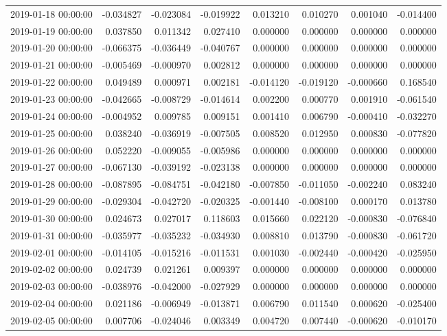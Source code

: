 \begin{tabular}{lrrrrrrr}
2019-01-18 00:00:00 & -0.034827 & -0.023084 & -0.019922 & 0.013210 & 0.010270 & 0.001040 & -0.014400 \\
2019-01-19 00:00:00 & 0.037850 & 0.011342 & 0.027410 & 0.000000 & 0.000000 & 0.000000 & 0.000000 \\
2019-01-20 00:00:00 & -0.066375 & -0.036449 & -0.040767 & 0.000000 & 0.000000 & 0.000000 & 0.000000 \\
2019-01-21 00:00:00 & -0.005469 & -0.000970 & 0.002812 & 0.000000 & 0.000000 & 0.000000 & 0.000000 \\
2019-01-22 00:00:00 & 0.049489 & 0.000971 & 0.002181 & -0.014120 & -0.019120 & -0.000660 & 0.168540 \\
2019-01-23 00:00:00 & -0.042665 & -0.008729 & -0.014614 & 0.002200 & 0.000770 & 0.001910 & -0.061540 \\
2019-01-24 00:00:00 & -0.004952 & 0.009785 & 0.009151 & 0.001410 & 0.006790 & -0.000410 & -0.032270 \\
2019-01-25 00:00:00 & 0.038240 & -0.036919 & -0.007505 & 0.008520 & 0.012950 & 0.000830 & -0.077820 \\
2019-01-26 00:00:00 & 0.052220 & -0.009055 & -0.005986 & 0.000000 & 0.000000 & 0.000000 & 0.000000 \\
2019-01-27 00:00:00 & -0.067130 & -0.039192 & -0.023138 & 0.000000 & 0.000000 & 0.000000 & 0.000000 \\
2019-01-28 00:00:00 & -0.087895 & -0.084751 & -0.042180 & -0.007850 & -0.011050 & -0.002240 & 0.083240 \\
2019-01-29 00:00:00 & -0.029304 & -0.042720 & -0.020325 & -0.001440 & -0.008100 & 0.000170 & 0.013780 \\
2019-01-30 00:00:00 & 0.024673 & 0.027017 & 0.118603 & 0.015660 & 0.022120 & -0.000830 & -0.076840 \\
2019-01-31 00:00:00 & -0.035977 & -0.035232 & -0.034930 & 0.008810 & 0.013790 & -0.000830 & -0.061720 \\
2019-02-01 00:00:00 & -0.014105 & -0.015216 & -0.011531 & 0.001030 & -0.002440 & -0.000420 & -0.025950 \\
2019-02-02 00:00:00 & 0.024739 & 0.021261 & 0.009397 & 0.000000 & 0.000000 & 0.000000 & 0.000000 \\
2019-02-03 00:00:00 & -0.038976 & -0.042000 & -0.027929 & 0.000000 & 0.000000 & 0.000000 & 0.000000 \\
2019-02-04 00:00:00 & 0.021186 & -0.006949 & -0.013871 & 0.006790 & 0.011540 & 0.000620 & -0.025400 \\
2019-02-05 00:00:00 & 0.007706 & -0.024046 & 0.003349 & 0.004720 & 0.007440 & -0.000620 & -0.010170 \\

\end{tabular}
